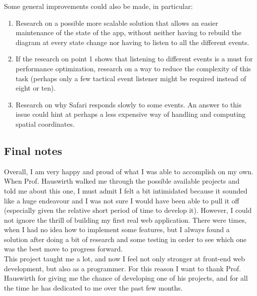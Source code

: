 \documentclass[]{usiinfbachelorproject}
\begin{document}
\vspace{\fill}
\pagebreak

\noindent Some general improvements could also be made, in particular:

\begin{enumerate}
	\item Research on a possible more scalable solution that allows an easier maintenance of the state of the app, without neither having to rebuild the diagram at every state change nor having to listen to all the different events.
	\item If the research on point 1 shows that listening to different events is a must for performance optimization, research on a way to reduce the complexity of this task (perhaps only a few tactical event listener might be required instead of eight or ten).
	\item Research on why Safari responds slowly to some events. An answer to this issue could hint at perhaps a less expensive way of handling and computing spatial coordinates.
\end{enumerate}

\subsection{Final notes}

Overall, I am very happy and proud of what I was able to accomplish on my own. When Prof. Hauswirth walked me through the possible available projects and told me about this one, I must admit I felt a bit intimidated because it sounded like a huge endeavour and I was not sure I would have been able to pull it off (especially given the relative short period of time to develop it). However, I could not ignore the thrill of building my first real web application. There were times, when I had no idea how to implement some features, but I always found a solution after doing a bit of research and some testing in order to see which one was the best move to progress forward.\\
This project taught me a lot, and now I feel not only stronger at front-end web development, but also as a programmer. For this reason I want to thank Prof. Hauswirth for giving me the chance of developing one of his projects, and for all the time he has dedicated to me over the past few months.

\vspace{\fill}

\pagebreak




\end{document}
